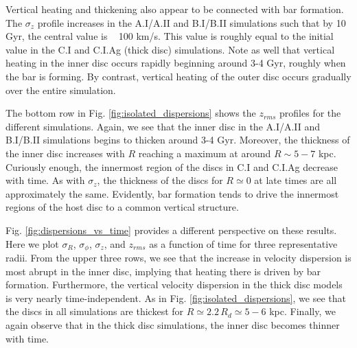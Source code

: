 
{Vertical heating and thickening also appear to be connected with
bar formation.  The $\sigma_z$ profile increases in the A.I/A.II and B.I/B.II simulations such
that by 10 Gyr, the central value is ~ 100 km/s. This value is roughly
equal to the initial value in the C.I and C.I.Ag (thick disc)
simulations. Note as well that vertical heating in the inner disc
occurs rapidly beginning around 3-4 Gyr, roughly when the bar
is forming. By contrast, vertical heating of the outer disc occurs
gradually over the entire simulation.}


{The bottom row in Fig. \ref{fig:isolated_dispersions} shows the $z_{rms}$ profiles for the different
simulations. Again, we see that the inner disc in the A.I/A.II and B.I/B.II
simulations begins to thicken around 3-4 Gyr. Moreover, the thickness of the inner disc
increases with $R$ reaching a maximum at around $R \sim 5-7$ kpc.
Curiously enough, the innermost region of the discs in C.I and C.I.Ag
decrease with time. As with $\sigma_z$, the thickness of the discs for
$R\simeq 0$ at late times are all approximately the same.
Evidently, bar formation tends to drive the innermost regions of the host disc
to a common vertical structure. }

{Fig. \ref{fig:dispersions_vs_time} provides a different perspective on these results. Here we
plot $\sigma_R$, $\sigma_\phi$, $\sigma_z$, and $z_{rms}$ as a function of time for three representative
radii.
From the upper three rows, we see that the increase in velocity dispersion
is most abrupt in the inner disc, implying that heating there is
driven by bar formation. Furthermore, the vertical velocity dispersion
in the thick disc models is very nearly time-independent.
As in Fig. \ref{fig:isolated_dispersions}, we see that the discs in all simulations are thickest
for $R \simeq 2.2\,R_d \simeq 5-6$ kpc. Finally, we again observe that
in the thick disc simulations, the inner disc becomes thinner with time.}



